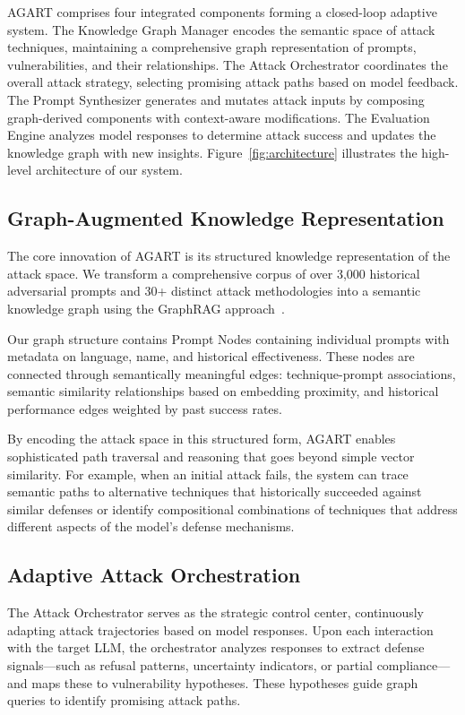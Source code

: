 AGART comprises four integrated components forming a closed-loop adaptive system. The Knowledge Graph Manager encodes the semantic space of attack techniques, maintaining a comprehensive graph representation of prompts, vulnerabilities, and their relationships. The Attack Orchestrator coordinates the overall attack strategy, selecting promising attack paths based on model feedback. The Prompt Synthesizer generates and mutates attack inputs by composing graph-derived components with context-aware modifications. The Evaluation Engine analyzes model responses to determine attack success and updates the knowledge graph with new insights. Figure~\ref{fig:architecture} illustrates the high-level architecture of our system.

\subsection{Graph-Augmented Knowledge Representation}

The core innovation of AGART is its structured knowledge representation of the attack space. We transform a comprehensive corpus of over 3,000 historical adversarial prompts and 30+ distinct attack methodologies into a semantic knowledge graph using the GraphRAG approach~\cite{GraphRAG}. 

Our graph structure contains Prompt Nodes containing individual prompts with metadata on language, name, and historical effectiveness. These nodes are connected through semantically meaningful edges: technique-prompt associations, semantic similarity relationships based on embedding proximity, and historical performance edges weighted by past success rates.

By encoding the attack space in this structured form, AGART enables sophisticated path traversal and reasoning that goes beyond simple vector similarity. For example, when an initial attack fails, the system can trace semantic paths to alternative techniques that historically succeeded against similar defenses or identify compositional combinations of techniques that address different aspects of the model's defense mechanisms.

\subsection{Adaptive Attack Orchestration}
The Attack Orchestrator serves as the strategic control center, continuously adapting attack trajectories based on model responses. Upon each interaction with the target LLM, the orchestrator analyzes responses to extract defense signals—such as refusal patterns, uncertainty indicators, or partial compliance—and maps these to vulnerability hypotheses. These hypotheses guide graph queries to identify promising attack paths.

